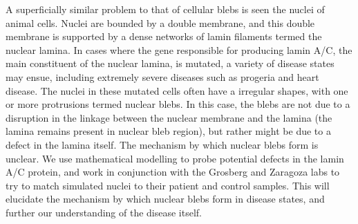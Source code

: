 A superficially similar problem to that of cellular blebs is seen the nuclei of animal cells. Nuclei are bounded by a double membrane, and this double membrane is supported by a dense networks of lamin filaments termed the nuclear lamina. In cases where the gene responsible for producing lamin A/C, the main constituent of the nuclear lamina, is mutated, a  variety of disease states may ensue, including extremely severe diseases such as progeria and heart disease. The nuclei in these mutated cells often have a irregular shapes, with one or more protrusions termed nuclear blebs. In this case, the blebs are not due to a disruption in the linkage between the nuclear membrane and the lamina  (the lamina remains present in nuclear bleb region), but rather might be due to a defect in the lamina itself. The mechanism by which nuclear blebs form is unclear. We use mathematical modelling to probe potential defects in the lamin A/C protein, and work in conjunction with the Grosberg and Zaragoza labs to try to match simulated nuclei to their patient and control samples. This will elucidate the mechanism by which nuclear blebs form in disease states, and further our understanding of the disease itself. 






  